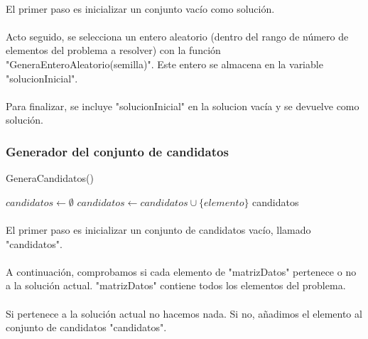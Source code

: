 \documentclass{article}
\begin{document}
	\paragraph{}El primer paso es inicializar un conjunto vacío como solución.
	
	\paragraph{}Acto seguido, se selecciona un entero aleatorio (dentro del rango de número de elementos del problema a resolver) con la función "GeneraEnteroAleatorio(semilla)". Este entero se almacena en la variable "solucionInicial".
	
	\paragraph{}Para finalizar, se incluye "solucionInicial" en la solucion vacía y se devuelve como solución.
	
	\subsubsection{Generador del conjunto de candidatos}
	\begin{algorithm}[H]
		\caption{GeneraCandidatos()}
		\begin{algorithmic}
			\STATE $candidatos \leftarrow \emptyset$
			\STATE $candidatos \leftarrow candidatos \cup \{elemento\}$
			\ENDIF
			\ENDFOR
			\RETURN candidatos
		\end{algorithmic}
	\end{algorithm}
	
	\paragraph{}El primer paso es inicializar un conjunto de candidatos vacío, llamado "candidatos".
	
	\paragraph{}A continuación, comprobamos si cada elemento de "matrizDatos" pertenece o no a la solución actual. "matrizDatos" contiene todos los elementos del problema.
	
	\paragraph{}Si pertenece a la solución actual no hacemos nada. Si no, añadimos el elemento al conjunto de candidatos "candidatos".
	
\end{document}
